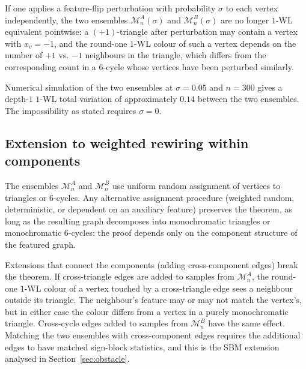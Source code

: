 If one applies a feature-flip perturbation with probability $\sigma$
to each vertex independently, the two ensembles $\mathcal{M}_n^A(\sigma)$
and $\mathcal{M}_n^B(\sigma)$ are no longer $1$-WL equivalent
pointwise: a $(+1)$-triangle after perturbation may contain a vertex
with $x_v = -1$, and the round-one $1$-WL colour of such a vertex
depends on the number of $+1$ vs. $-1$ neighbours in the triangle,
which differs from the corresponding count in a $6$-cycle whose
vertices have been perturbed similarly.

Numerical simulation of the two ensembles at $\sigma = 0.05$ and
$n = 300$ gives a depth-$1$ $1$-WL total variation of approximately
$0.14$ between the two ensembles. The impossibility as stated
requires $\sigma = 0$.

\subsection{Extension to weighted rewiring within components}

The ensembles $\mathcal{M}_n^A$ and $\mathcal{M}_n^B$ use uniform
random assignment of vertices to triangles or $6$-cycles. Any
alternative assignment procedure (weighted random, deterministic,
or dependent on an auxiliary feature) preserves the theorem, as
long as the resulting graph decomposes into monochromatic triangles
or monochromatic $6$-cycles: the proof depends only on the
component structure of the featured graph.

Extensions that connect the components (adding cross-component
edges) break the theorem. If cross-triangle edges are added to
samples from $\mathcal{M}_n^A$, the round-one $1$-WL colour of a
vertex touched by a cross-triangle edge sees a neighbour outside
its triangle. The neighbour's feature may or may not match the
vertex's, but in either case the colour differs from a vertex in a
purely monochromatic triangle. Cross-cycle edges added to samples
from $\mathcal{M}_n^B$ have the same effect. Matching the two
ensembles with cross-component edges requires the additional edges
to have matched sign-block statistics, and this is the SBM
extension analysed in Section~\ref{sec:obstacle}.

